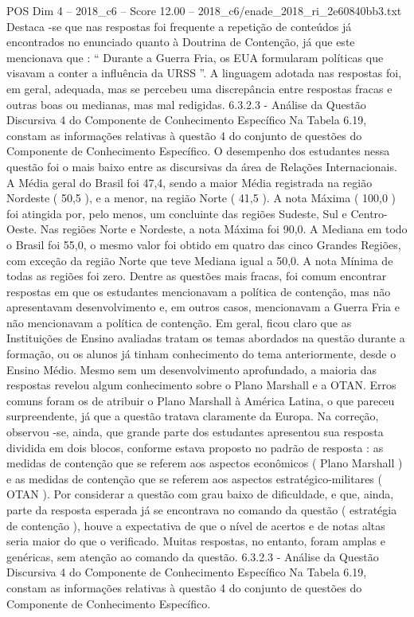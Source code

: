 \begin{textsample}{POS Dim 4 – 2018\_c6 – Score 12.00 – 2018\_c6/enade\_2018\_ri\_2e60840bb3.txt}
Destaca -se que nas respostas foi frequente a repetição de conteúdos já encontrados no enunciado quanto à Doutrina de Contenção, já que este mencionava que : “ Durante a Guerra Fria, os EUA formularam políticas que visavam a conter a influência da URSS ”.
A linguagem adotada nas respostas foi, em geral, adequada, mas se percebeu uma discrepância entre respostas fracas e outras boas ou medianas, mas mal redigidas. 6.3.2.3 - Análise da Questão Discursiva 4 do Componente de Conhecimento Específico Na Tabela 6.19, constam as informações relativas à questão 4 do conjunto de questões do Componente de Conhecimento Específico.
O desempenho dos estudantes nessa questão foi o mais baixo entre as discursivas da área de Relações Internacionais.
A Média geral do Brasil foi 47,4, sendo a maior Média registrada na região Nordeste ( 50,5 ), e a menor, na região Norte ( 41,5 ).
A nota Máxima ( 100,0 ) foi atingida por, pelo menos, um concluinte das regiões Sudeste, Sul e Centro-Oeste.
Nas regiões Norte e Nordeste, a nota Máxima foi 90,0.
A Mediana em todo o Brasil foi 55,0, o mesmo valor foi obtido em quatro das cinco Grandes Regiões, com exceção da região Norte que teve Mediana igual a 50,0.
A nota Mínima de todas as regiões foi zero.
Dentre as questões mais fracas, foi comum encontrar respostas em que os estudantes mencionavam a política de contenção, mas não apresentavam desenvolvimento e, em outros casos, mencionavam a Guerra Fria e não mencionavam a política de contenção.
Em geral, ficou claro que as Instituições de Ensino avaliadas tratam os temas abordados na questão durante a formação, ou os alunos já tinham conhecimento do tema anteriormente, desde o Ensino Médio.
Mesmo sem um desenvolvimento aprofundado, a maioria das respostas revelou algum conhecimento sobre o Plano Marshall e a OTAN.
Erros comuns foram os de atribuir o Plano Marshall à América Latina, o que pareceu surpreendente, já que a questão tratava claramente da Europa.
Na correção, observou -se, ainda, que grande parte dos estudantes apresentou sua resposta dividida em dois blocos, conforme estava proposto no padrão de resposta : as medidas de contenção que se referem aos aspectos econômicos ( Plano Marshall ) e as medidas de contenção que se referem aos aspectos estratégico-militares ( OTAN ).
Por considerar a questão com grau baixo de dificuldade, e que, ainda, parte da resposta esperada já se encontrava no comando da questão ( estratégia de contenção ), houve a expectativa de que o nível de acertos e de notas altas seria maior do que o verificado.
Muitas respostas, no entanto, foram amplas e genéricas, sem atenção ao comando da questão. 6.3.2.3 - Análise da Questão Discursiva 4 do Componente de Conhecimento Específico Na Tabela 6.19, constam as informações relativas à questão 4 do conjunto de questões do Componente de Conhecimento Específico.

\end{textsample}
